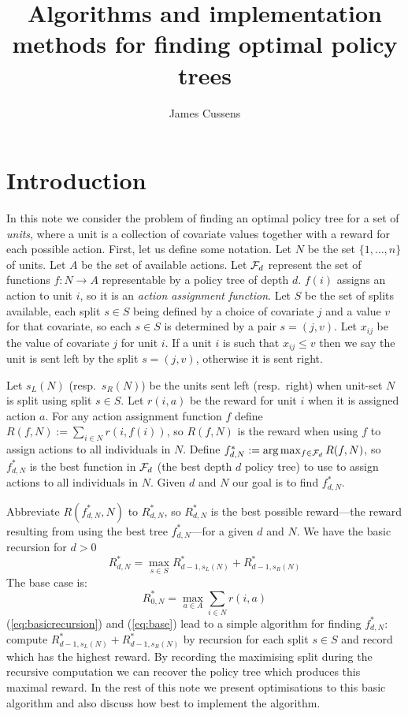 \documentclass{article}
\title{Algorithms and implementation methods for finding optimal policy trees}
\author{James Cussens}
\begin{document}
\maketitle

\section{Introduction}
\label{sec:intro}

In this note we consider the problem of finding an optimal policy tree
for a set of \emph{units}, where a unit is a collection of covariate
values together with a reward for each possible action. First, let us
define some notation.  Let $N$ be the set $\{1,\dots,n\}$ of
units. Let $A$ be the set of available actions.  Let ${\cal F}_d$
represent the set of functions $f:N \rightarrow A$ representable by a
policy tree of depth $d$. $f(i)$ assigns an action to unit $i$, so it
is an \emph{action assignment function}. Let $S$ be the set of splits
available, each split $s \in S$ being defined by a choice of covariate
$j$ and a value $v$ for that covariate, so each $s \in S$ is
determined by a pair $s=(j,v)$. Let $x_{ij}$ be the value of
covariate $j$ for unit $i$. If a unit $i$ is such that
$x_{ij} \leq v$ then we say the unit is sent left by the split $s=(j,v)$,
otherwise it is sent right.

Let $s_{L}(N)$ (resp.\ $s_{R}(N)$) be the units sent left (resp.\
right) when unit-set $N$ is split using split $s \in S$. Let $r(i,a)$
be the reward for unit $i$ when it is assigned action $a$. For any
action assignment function $f$ define
$R(f,N) := \sum_{i \in N} r(i,f(i))$, so $R(f,N)$ is the reward when
using $f$ to assign actions to all individuals in $N$. Define
$f^{*}_{d,N} := \arg\max_{f \in {\cal F}_d} R(f,N)$, so $f^{*}_{d,N}$
is the best function in ${\cal F}_d$ (the best depth $d$ policy tree)
to use to assign actions to all individuals in $N$. Given $d$ and $N$
our goal is to find $f^{*}_{d,N}$.

Abbreviate $R(f^{*}_{d,N},N)$ to $R^{*}_{d,N}$, so $R^{*}_{d,N}$ is the best
possible reward---the reward resulting from using the best tree
$f^{*}_{d,N}$---for a given $d$ and $N$. We have the basic recursion
for $d>0$
\begin{equation}
  \label{eq:basicrecursion}
  R^{*}_{d,N}
  = \max_{s \in S}   R^{*}_{d-1,s_{L}(N)} + R^{*}_{d-1,s_{R}(N)} 
\end{equation}
The base case is:
\begin{equation}
  \label{eq:base}
    R^{*}_{0,N} =  \max_{a \in A} \sum_{i \in N}  r(i,a)
\end{equation}
(\ref{eq:basicrecursion}) and (\ref{eq:base}) lead to a simple
algorithm for finding $f^{*}_{d,N}$: compute $R^{*}_{d-1,s_{L}(N)} +
R^{*}_{d-1,s_{R}(N)}$ by recursion for each split $s \in S$ and record
which has the highest reward. By recording the maximising
split during the recursive computation we can recover the policy tree
which produces this maximal reward. In the rest of this note we
present optimisations to this basic algorithm and also discuss how
best to implement the algorithm.
\end{document}
